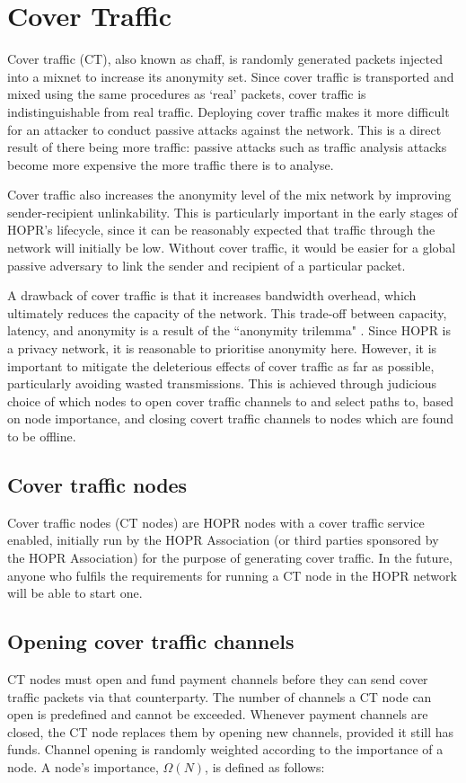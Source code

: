 \section{Cover Traffic}
\label{sec:CT}

Cover traffic (CT), also known as chaff, is randomly generated packets injected into a mixnet to increase its anonymity set. Since cover traffic is transported and mixed using the same procedures as `real' packets, cover traffic is indistinguishable from real traffic. Deploying cover traffic makes it more difficult for an attacker to conduct passive attacks against the network. This is a direct result of there being more traffic: passive attacks such as traffic analysis attacks become more expensive the more traffic there is to analyse.

Cover traffic also increases the anonymity level of the mix network by improving sender-recipient unlinkability. This is particularly important in the early stages of HOPR's lifecycle, since it can be reasonably expected that traffic through the network will initially be low. Without cover traffic, it would be easier for a global passive adversary to link the sender and recipient of a particular packet.

A drawback of cover traffic is that it increases bandwidth overhead, which ultimately reduces the capacity of the network. This trade-off between capacity, latency, and anonymity is a result of the ``anonymity trilemma" \cite{AnonymityTrilemma}. Since HOPR is a privacy network, it is reasonable to prioritise anonymity here. However, it is important to mitigate the deleterious effects of cover traffic as far as possible, particularly avoiding wasted transmissions. This is achieved through judicious choice of which nodes to open cover traffic channels to and select paths to, based on node importance, and closing covert traffic channels to nodes which are found to be offline. 

\subsection{Cover traffic nodes}
Cover traffic nodes (CT nodes) are HOPR nodes with a cover traffic service enabled, initially run by the HOPR Association (or third parties sponsored by the HOPR Association) for the purpose of generating cover traffic. In the future, anyone who fulfils the requirements for running a CT node in the HOPR network will be able to start one.

\subsection{Opening cover traffic channels} 
CT nodes must open and fund payment channels before they can send cover traffic packets via that counterparty. The number of channels a CT node can open is predefined and cannot be exceeded. Whenever payment channels are closed, the CT node replaces them by opening new channels, provided it still has funds. Channel opening is randomly weighted according to the importance of a node. A node's importance, $\Omega(N)$, is defined as follows:

